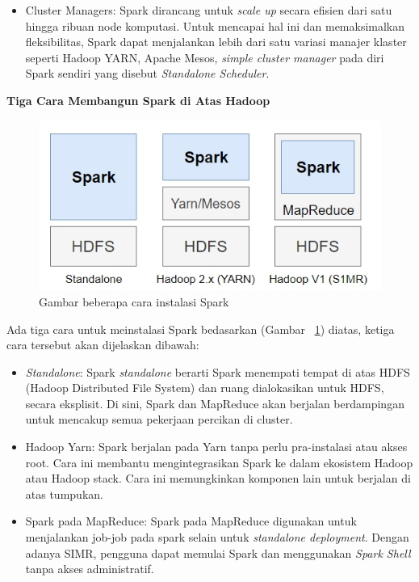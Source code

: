 \documentclass[a4paper,twoside]{article}
\begin{document}
\begin{enumerate}
\begin{itemize}
\item Cluster Managers: Spark dirancang untuk \textit{scale up} secara efisien dari satu hingga ribuan node komputasi. Untuk mencapai hal ini dan memaksimalkan fleksibilitas, Spark dapat menjalankan lebih dari satu variasi manajer klaster seperti Hadoop YARN, Apache Mesos, \textit{simple
cluster manager} pada diri Spark sendiri yang disebut \textit{Standalone Scheduler}.

\end{itemize}

\textbf{Tiga Cara Membangun Spark di Atas Hadoop}

\begin{figure}[H]
    \centering  
    \includegraphics[scale=0.6]{sparkins}  
    \caption[Gambar beberapa cara instalasi Spark]{Gambar beberapa cara instalasi Spark} 
    \label{fig:sparkins} 
\end{figure}

Ada tiga cara untuk meinstalasi Spark bedasarkan (Gambar ~\ref{fig:sparkins}) diatas, ketiga cara tersebut akan dijelaskan dibawah:

\begin{itemize}

\item \textit{Standalone}: Spark \textit{standalone} berarti Spark menempati tempat di atas HDFS (Hadoop Distributed File System) dan ruang dialokasikan untuk HDFS, secara eksplisit. Di sini, Spark dan MapReduce akan berjalan berdampingan untuk mencakup semua pekerjaan percikan di cluster.

\item Hadoop Yarn: Spark berjalan pada Yarn tanpa perlu pra-instalasi atau akses root. Cara ini membantu mengintegrasikan Spark ke dalam ekosistem Hadoop atau Hadoop stack. Cara ini memungkinkan komponen lain untuk berjalan di atas tumpukan.

\item Spark pada MapReduce: Spark pada MapReduce digunakan untuk menjalankan job-job pada spark selain untuk \textit{standalone deployment}. Dengan adanya SIMR, pengguna dapat memulai Spark dan menggunakan \textit{Spark Shell} tanpa akses administratif.


\end{itemize}
\end{enumerate}
\end{document}
